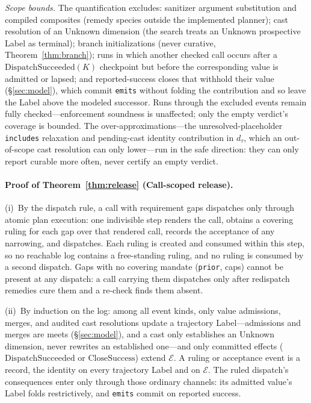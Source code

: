 \emph{Scope bounds.} The quantification excludes: sanitizer argument substitution and compiled composites (remedy species outside the implemented planner); cast resolution of an Unknown dimension (the search treats an Unknown prospective Label as terminal); branch initializations (never curative, Theorem~\ref{thm:branch}); runs in which another checked call occurs after a $\mathrm{DispatchSucceeded}(K)$ checkpoint but before the corresponding value is admitted or lapsed; and reported-success closes that withhold their value (\S\ref{sec:model}), which commit \texttt{emits} without folding the contribution and so leave the Label above the modeled successor. Runs through the excluded events remain fully checked---enforcement soundness is unaffected; only the empty verdict's coverage is bounded. The over-approximations---the unresolved-placeholder \texttt{includes} relaxation and pending-cast identity contribution in $d_\tau$, which an out-of-scope cast resolution can only lower---run in the safe direction: they can only report curable more often, never certify an empty verdict.

\paragraph{Proof of Theorem~\ref{thm:release} (Call-scoped release).}
(i)~By the dispatch rule, a call with requirement gaps dispatches only through atomic plan execution: one indivisible step renders the call, obtains a covering ruling for each gap over that rendered call, records the acceptance of any narrowing, and dispatches. Each ruling is created and consumed within this step, so no reachable log contains a free-standing ruling, and no ruling is consumed by a second dispatch. Gaps with no covering mandate (\texttt{prior}, caps) cannot be present at any dispatch: a call carrying them dispatches only after redispatch remedies cure them and a re-check finds them absent.

(ii)~By induction on the log: among all event kinds, only value admissions, merges, and audited cast resolutions update a trajectory Label---admissions and merges are meets (\S\ref{sec:model}), and a cast only establishes an Unknown dimension, never rewrites an established one---and only committed effects ($\mathrm{DispatchSucceeded}$ or $\mathrm{CloseSuccess}$) extend $\mathcal{E}$. A ruling or acceptance event is a record, the identity on every trajectory Label and on $\mathcal{E}$. The ruled dispatch's consequences enter only through those ordinary channels: its admitted value's Label folds restrictively, and \texttt{emits} commit on reported success.


